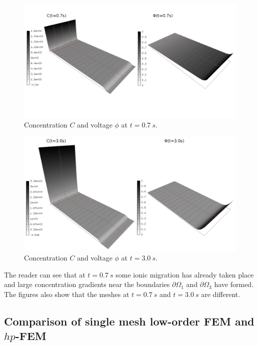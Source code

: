 \begin{figure}[!ht]
  \begin{centering}
  \includegraphics[width=\columnwidth]{cphi-1}
  \caption{\label{fig:cphi-1} Concentration $C$
  and voltage $\phi$ at $t=0.7\ s$.}
  \end{centering}
\end{figure}

\newpage

\begin{figure}[!ht]
  \begin{centering}
  \includegraphics[width=\columnwidth]{cphi-2}
  \caption{\label{fig:cphi-2} Concentration $C$
  and voltage $\phi$ at $t=3.0\ s$.}
  \end{centering}
\end{figure}

The reader can see that at $t=0.7\ s$ some ionic migration has already 
taken place and large concentration gradients near the boundaries $\partial\Omega_1$ 
and $\partial\Omega_3$ have formed. The figures also show that the meshes 
at $t=0.7\ s$ and $t=3.0\ s$ are different. 

\subsection{Comparison of single mesh low-order FEM and $hp$-FEM}

